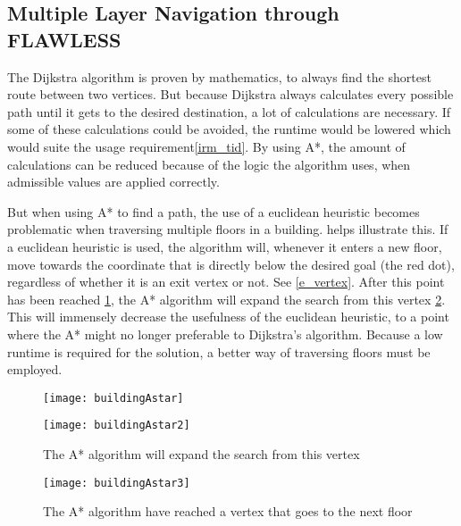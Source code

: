 \subsection{Multiple Layer Navigation through FLAWLESS} \label{multlayhan}

The Dijkstra algorithm is proven by mathematics, to always find the shortest route between two vertices. But because Dijkstra always calculates every possible path until it gets to the desired destination, a lot of calculations are necessary. If some of these calculations could be avoided, the runtime would be lowered which would suite the usage requirement\cref{irm_tid}. By using A*, the amount of calculations can be reduced because of the logic the algorithm uses, when admissible values are applied correctly.

But when using A* to find a path, the use of a euclidean heuristic becomes problematic when traversing multiple floors in a building.  helps illustrate this. If a euclidean heuristic is used, the algorithm will, whenever it enters a new floor, move towards the coordinate that is directly below the desired goal (the red dot), regardless of whether it is an exit vertex or not. See \cref{e_vertex}. After this point has been reached \cref{fig:buildingAstar2}, the A* algorithm will expand the search from this vertex \cref{fig:buildingAstar3}. This will immensely decrease the usefulness of the euclidean heuristic, to a point where the A* might no longer preferable to Dijkstra's algorithm. Because a low runtime is required for the solution, a better way of traversing floors must be employed.


\begin{figure}
\centering
  \begin{minipage}{0.45\textwidth}
    \centering
    \texttt{[image: buildingAstar]}
    \caption{Step 1: How the A* algorithm would expand, if using the euclidean distance as heuristic}
    \label{fig:buildingAstar1}
  \end{minipage}
  \hfill
  \begin{minipage}{0.45\textwidth}
    \centering
    \texttt{[image: buildingAstar2]}
    \caption{The A* algorithm will expand the search from this vertex}
    \label{fig:buildingAstar2}
  \end{minipage}
\end{figure}
  
\begin{figure}[ht!]
\raggedright
  \texttt{[image: buildingAstar3]}
  \caption{The A* algorithm have reached a vertex that goes to the next floor}
  \label{fig:buildingAstar3}
\end{figure}


